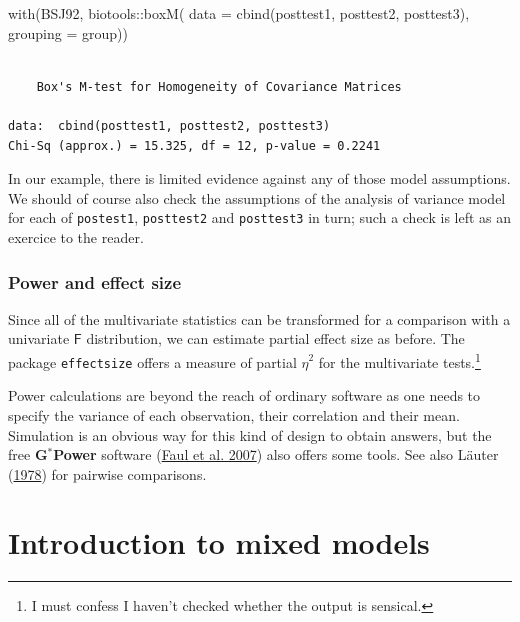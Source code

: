 \documentclass[
  11pt,
  letterpaper,
]{scrbook}
\newenvironment{Shaded}{\begin{snugshade}}{\end{snugshade}}
\newcommand{\AttributeTok}[1]{\textcolor[rgb]{0.40,0.45,0.13}{#1}}
\newcommand{\FunctionTok}[1]{\textcolor[rgb]{0.28,0.35,0.67}{#1}}
\newcommand{\NormalTok}[1]{\textcolor[rgb]{0.00,0.23,0.31}{#1}}
\newcommand{\SpecialCharTok}[1]{\textcolor[rgb]{0.37,0.37,0.37}{#1}}
\theoremstyle{definition}
\theoremstyle{remark}
\begin{document}
\begin{Shaded}
\begin{Highlighting}[]
\FunctionTok{with}\NormalTok{(BSJ92, }
\NormalTok{     biotools}\SpecialCharTok{::}\FunctionTok{boxM}\NormalTok{(}
       \AttributeTok{data =} \FunctionTok{cbind}\NormalTok{(posttest1, posttest2, posttest3),}
       \AttributeTok{grouping =}\NormalTok{ group))}
\end{Highlighting}
\end{Shaded}

\begin{verbatim}

    Box's M-test for Homogeneity of Covariance Matrices

data:  cbind(posttest1, posttest2, posttest3)
Chi-Sq (approx.) = 15.325, df = 12, p-value = 0.2241
\end{verbatim}

In our example, there is limited evidence against any of those model
assumptions. We should of course also check the assumptions of the
analysis of variance model for each of \texttt{postest1},
\texttt{posttest2} and \texttt{posttest3} in turn; such a check is left
as an exercice to the reader.

\hypertarget{power-and-effect-size}{%
\subsection{Power and effect size}\label{power-and-effect-size}}

Since all of the multivariate statistics can be transformed for a
comparison with a univariate \(\mathsf{F}\) distribution, we can
estimate partial effect size as before. The package \texttt{effectsize}
offers a measure of partial \(\widehat{\eta}^2\) for the multivariate
tests.\footnote{I must confess I haven't checked whether the output is
  sensical.}

Power calculations are beyond the reach of ordinary software as one
needs to specify the variance of each observation, their correlation and
their mean. Simulation is an obvious way for this kind of design to
obtain answers, but the free \textbf{G}\({}^{*}\)\textbf{Power} software
(\protect\hyperlink{ref-GPower3}{Faul et al. 2007}) also offers some
tools. See also Läuter (\protect\hyperlink{ref-Lauter:1978}{1978}) for
pairwise comparisons.


\hypertarget{introduction-to-mixed-models}{%
\chapter{Introduction to mixed
models}\label{introduction-to-mixed-models}}
\end{document}
